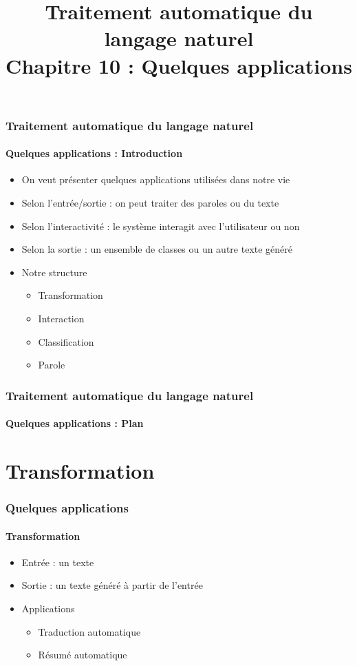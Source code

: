 \documentclass[xcolor=table]{beamer}
\title[TALN : 10- Quelques applications]%
{Traitement automatique du langage naturel\\Chapitre 10 : Quelques applications}
\begin{document}
	
\begin{frame}
\frametitle{Traitement automatique du langage naturel}
\framesubtitle{Quelques applications : Introduction}

	\begin{itemize}
		\item On veut présenter quelques applications utilisées dans notre vie
		\item Selon l'entrée/sortie : on peut traiter des paroles ou du texte
		\item Selon l'interactivité : le système interagit avec l'utilisateur ou non
		\item Selon la sortie : un ensemble de classes ou un autre texte généré
		\item Notre structure 
		\begin{itemize}
			\item Transformation
			\item Interaction
			\item Classification
			\item Parole
		\end{itemize}
	\end{itemize}

\end{frame}

%
%

\begin{frame}
\frametitle{Traitement automatique du langage naturel}
\framesubtitle{Quelques applications : Plan}

\begin{multicols}{2}
\tableofcontents
\end{multicols}
\end{frame}

\section{Transformation}

\begin{frame}
	\frametitle{Quelques applications}
	\framesubtitle{Transformation}
	\begin{itemize}
		\item Entrée : un texte 
		\item Sortie : un texte généré à partir de l'entrée
		\item Applications 
		\begin{itemize}
			\item Traduction automatique
			\item Résumé automatique
		\end{itemize}
	\end{itemize}
\end{frame}
\end{document}
